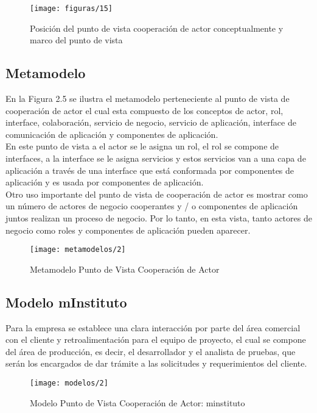    \begin{figure}[H]
   	\centering
   	\texttt{[image: figuras/15]}
   	\captionsetup{width=.95\textwidth}
   	\caption{Posición del punto de vista cooperación de actor conceptualmente y marco del punto de vista}
   	\label{figura15}
   \end{figure}
  
  \subsection{Metamodelo}
  En la Figura 2.5 se ilustra el metamodelo perteneciente al punto de vista de cooperación de actor el cual esta compuesto de los conceptos de actor, rol, interface, colaboración, servicio de negocio, servicio de aplicación, interface de comunicación de aplicación y componentes de aplicación.\\
  
  En este punto de vista a el actor se le asigna un rol, el rol se compone de interfaces, a la interface se le asigna servicios y estos servicios van a una capa de aplicación a través de una interface que está conformada por componentes de aplicación y es usada por componentes de aplicación. \\
  
  Otro uso importante del punto de vista de cooperación de actor es mostrar como un número de actores de negocio cooperantes y / o componentes de aplicación juntos realizan un proceso de negocio. Por lo tanto, en esta vista, tanto actores de negocio como roles y componentes de aplicación pueden aparecer.  
  
  \begin{figure}[H]
  	\centering
  	\texttt{[image: metamodelos/2]}
  	\captionsetup{width=.95\textwidth}
  	\caption{Metamodelo Punto de Vista Cooperación de Actor}
  	\label{metamodelo2}
  \end{figure}
  
  \subsection{Modelo mInstituto}
  Para la empresa se establece una clara interacción por parte del área comercial con el cliente y retroalimentación para el equipo de proyecto, el cual se compone del área de producción, es decir, el desarrollador y el analista de pruebas, que serán los encargados de dar trámite a las solicitudes y requerimientos del cliente.
  
  \begin{figure}[H]
  	\centering
  	\texttt{[image: modelos/2]}
  	\captionsetup{width=.95\textwidth}
  	\caption{Modelo Punto de Vista Cooperación de Actor: minstituto}
  	\label{modelo2}
  \end{figure}
 
